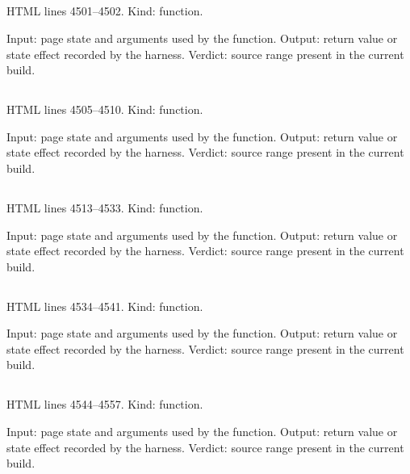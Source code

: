 \subsection*{\texttt{}}
\label{vf_184_sopFmtTime}
HTML lines 4501--4502. Kind: function.

Input: page state and arguments used by the function.
Output: return value or state effect recorded by the harness.
Verdict: source range present in the current build.

\subsection*{\texttt{}}
\label{vf_185_wellSignal}
HTML lines 4505--4510. Kind: function.

Input: page state and arguments used by the function.
Output: return value or state effect recorded by the harness.
Verdict: source range present in the current build.

\subsection*{\texttt{}}
\label{vf_186_runTimeline}
HTML lines 4513--4533. Kind: function.

Input: page state and arguments used by the function.
Output: return value or state effect recorded by the harness.
Verdict: source range present in the current build.

\subsection*{\texttt{}}
\label{vf_187_runTimes}
HTML lines 4534--4541. Kind: function.

Input: page state and arguments used by the function.
Output: return value or state effect recorded by the harness.
Verdict: source range present in the current build.

\subsection*{\texttt{}}
\label{vf_188_sopStdCurves}
HTML lines 4544--4557. Kind: function.

Input: page state and arguments used by the function.
Output: return value or state effect recorded by the harness.
Verdict: source range present in the current build.


